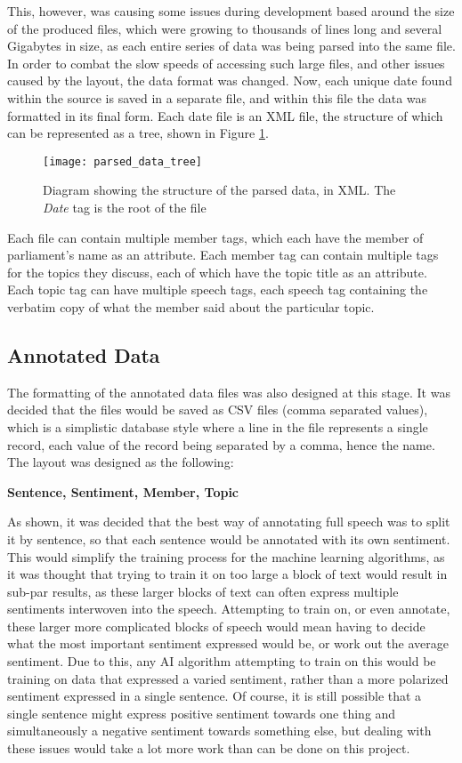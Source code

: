 This, however, was causing some issues during development based around the size of the produced files, which were growing to thousands of lines long and several Gigabytes in size, as each entire series of data was being parsed into the same file. In order to combat the slow speeds of accessing such large files, and other issues caused by the layout, the data format was changed. Now, each unique date found within the source is saved in a separate file, and within this file the data was formatted in its final form.
Each date file is an XML file, the structure of which can be represented as a tree, shown in Figure \ref{fig:parsed_data_tree}.

\begin{figure}[ht]
	\texttt{[image: parsed\_data\_tree]}
	\caption{Diagram showing the structure of the parsed data, in XML. The \emph{Date} tag is the root of the file}
	\label{fig:parsed_data_tree}
\end{figure}

Each file can contain multiple member tags, which each have the member of parliament’s name as an attribute. Each member tag can contain multiple tags for the topics they discuss, each of which have the topic title as an attribute. Each topic tag can have multiple speech tags, each speech tag containing the verbatim copy of what the member said about the particular topic.

\subsection{Annotated Data}
\label{sec:des_anotate_data}
The formatting of the annotated data files was also designed at this stage. It was decided that the files would be saved as CSV files (comma separated values), which is a simplistic database style where a line in the file represents a single record, each value of the record being separated by a comma, hence the name. The layout was designed as the following:

\textbf{Sentence, Sentiment, Member, Topic}

As shown, it was decided that the best way of annotating full speech was to split it by sentence, so that each sentence would be annotated with its own sentiment. This would simplify the training process for the machine learning algorithms, as it was thought that trying to train it on too large a block of text would result in sub-par results, as these larger blocks of text can often express multiple sentiments interwoven into the speech. Attempting to train on, or even annotate, these larger more complicated blocks of speech would mean having to decide what the most important sentiment expressed would be, or work out the average sentiment. Due to this, any AI algorithm attempting to train on this would be training on data that expressed a varied sentiment, rather than a more polarized sentiment expressed in a single sentence. Of course, it is still possible that a single sentence might express positive sentiment towards one thing and simultaneously a negative sentiment towards something else, but dealing with these issues would take a lot more work than can be done on this project. 

